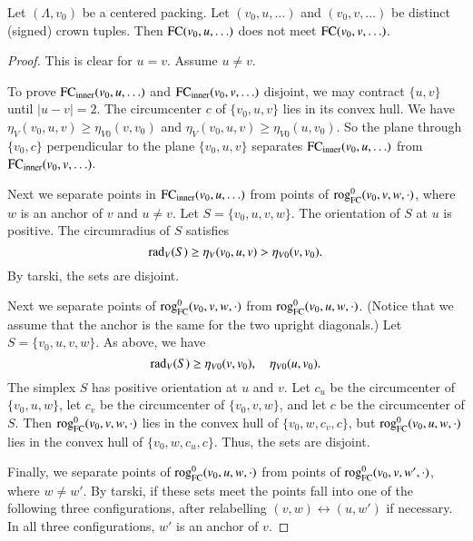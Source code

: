 \begin{lemma}
Let $(\Lambda,v_0)$ be a centered packing.  Let $(v_0,u,\ldots)$
and $(v_0,v,\ldots)$ be distinct (signed) crown tuples.
Then ${\operatorname{FC}}(v_0,u,\ldots)$ does not meet ${\operatorname{FC}}(v_0,v,\ldots)$.
\end{lemma}

\begin{proof}
This is clear for  $u=v$.  Assume $u\ne v$.  

To prove ${\operatorname{FC}}_{\text{inner}}(v_0,u,\ldots)$ and ${\operatorname{FC}}_{\text{inner}}(v_0,v,\ldots)$
disjoint, we
may contract $\{u,v\}$ until $|u-v|=2$. The circumcenter $c$ of 
$\{v_0,u,v\}$ lies
in its convex hull.  We have $\eta_V(v_0,u,v)\ge
\eta_{V0}(v,v_0)$ and $\eta_V(v_0,u,v)\ge\eta_{V0}(u,v_0)$.  So the plane
through $\{v_0,c\}$ perpendicular to the plane $\{v_0,u,v\}$ separates
${\operatorname{FC}}_{\text{inner}}(v_0,u,\ldots)$ from ${\operatorname{FC}}_{\text{inner}}(v_0,v,\ldots)$.

Next we separate points in ${\operatorname{FC}}_{\text{inner}}(v_0,u,\ldots)$ from points of
${\operatorname{rog}}^0_{\text{FC}}(v_0,v,w,\cdot)$, where $w$ is an anchor of $v$ and $u\ne v$.  Let
$S=\{v_0,u,v,w\}$. The orientation of $S$ at $u$  is
positive.  The circumradius of $S$ satisfies
    $$
    \operatorname{rad}_V(S) \ge \eta_V(v_0,u,v)>\eta_{V0}(v,v_0).
    $$
By tarski, 
the sets are disjoint.

Next we separate points of ${\operatorname{rog}}^0_{\text{FC}}(v_0,v,w,\cdot)$ from 
${\operatorname{rog}}^0_{\text{FC}}(v_0,u,w,\cdot)$.  (Notice
that we assume that the anchor is the same for the two upright diagonals.)
Let $S=\{v_0,u,v,w\}$.   As above, we have
    $$
    \operatorname{rad}_V(S) \ge \eta_{V0}(v,v_0), \quad \eta_{V0}(u,v_0).
    $$
The simplex $S$ has positive orientation at $u$ and $v$.  
Let $c_u$ be the circumcenter of
$\{v_0,u,w\}$, let $c_v$ be the circumcenter of $\{v_0,v,w\}$, and let
$c$ be the circumcenter of $S$.  Then ${\operatorname{rog}}^0_{\text{FC}}(v_0,v,w,\cdot)$ lies in the
convex hull of $\{v_0,w,c_v,c\}$, but ${\operatorname{rog}}^0_{\text{FC}}(v_0,u,w,\cdot)$ lies in the convex
hull of $\{v_0,w,c_u,c\}$.  Thus, the sets are disjoint.



Finally, we separate points of ${\operatorname{rog}}^0_{\text{FC}}(v_0,u,w,\cdot)$ from points of
${\operatorname{rog}}^0_{\text{FC}}(v_0,v,w',\cdot)$,  where $w\ne w'$. 
By tarski, if these sets meet the points fall into
one of the following three configurations, after relabelling $(v,w)\leftrightarrow(u,w')$
if necessary.  In all three configurations, $w'$ is an anchor of $v$.


\end{proof}
